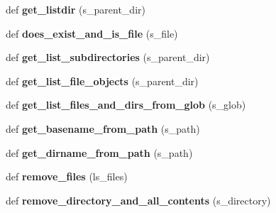 \begin{DoxyCompactItemize}
\item 
def {\bfseries get\+\_\+listdir} (s\+\_\+parent\+\_\+dir)\hypertarget{namespacenegui_1_1pgutilities_a46ba7adf1f3b80ee22ab635fa22ec8fa}{}\label{namespacenegui_1_1pgutilities_a46ba7adf1f3b80ee22ab635fa22ec8fa}

\item 
def {\bfseries does\+\_\+exist\+\_\+and\+\_\+is\+\_\+file} (s\+\_\+file)\hypertarget{namespacenegui_1_1pgutilities_a1be11f0c22a8f0b3cd2574ba02c2e04a}{}\label{namespacenegui_1_1pgutilities_a1be11f0c22a8f0b3cd2574ba02c2e04a}

\item 
def {\bfseries get\+\_\+list\+\_\+subdirectories} (s\+\_\+parent\+\_\+dir)\hypertarget{namespacenegui_1_1pgutilities_aa598e123d913111c3f191c0a725b57fd}{}\label{namespacenegui_1_1pgutilities_aa598e123d913111c3f191c0a725b57fd}

\item 
def {\bfseries get\+\_\+list\+\_\+file\+\_\+objects} (s\+\_\+parent\+\_\+dir)\hypertarget{namespacenegui_1_1pgutilities_ad045331ad9e74cc1d8fdc2a8c2b050af}{}\label{namespacenegui_1_1pgutilities_ad045331ad9e74cc1d8fdc2a8c2b050af}

\item 
def {\bfseries get\+\_\+list\+\_\+files\+\_\+and\+\_\+dirs\+\_\+from\+\_\+glob} (s\+\_\+glob)\hypertarget{namespacenegui_1_1pgutilities_aa5d355d2c26bf4992ce682449dfb93fc}{}\label{namespacenegui_1_1pgutilities_aa5d355d2c26bf4992ce682449dfb93fc}

\item 
def {\bfseries get\+\_\+basename\+\_\+from\+\_\+path} (s\+\_\+path)\hypertarget{namespacenegui_1_1pgutilities_abbecfce3431917f0ed764bc056b04fdc}{}\label{namespacenegui_1_1pgutilities_abbecfce3431917f0ed764bc056b04fdc}

\item 
def {\bfseries get\+\_\+dirname\+\_\+from\+\_\+path} (s\+\_\+path)\hypertarget{namespacenegui_1_1pgutilities_ae147f21f478f594d3e696d9198fa999b}{}\label{namespacenegui_1_1pgutilities_ae147f21f478f594d3e696d9198fa999b}

\item 
def {\bfseries remove\+\_\+files} (ls\+\_\+files)\hypertarget{namespacenegui_1_1pgutilities_ab276fa71e3e15636a51644dcb4f395ba}{}\label{namespacenegui_1_1pgutilities_ab276fa71e3e15636a51644dcb4f395ba}

\item 
def {\bfseries remove\+\_\+directory\+\_\+and\+\_\+all\+\_\+contents} (s\+\_\+directory)\hypertarget{namespacenegui_1_1pgutilities_a875eb2ebf5dfc37b07e37f7c0b288afb}{}\label{namespacenegui_1_1pgutilities_a875eb2ebf5dfc37b07e37f7c0b288afb}


\end{DoxyCompactItemize}
